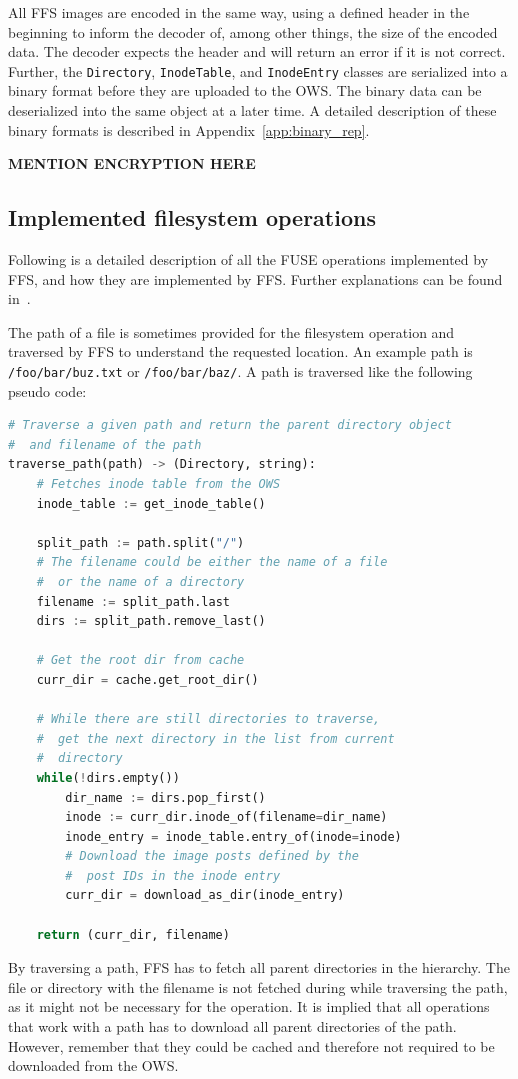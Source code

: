 All FFS images are encoded in the same way, using a defined header in the beginning to inform the decoder of, among other things, the size of the encoded data. The decoder expects the header and will return an error if it is not correct. Further, the \texttt{Directory}, \texttt{InodeTable}, and \texttt{InodeEntry} classes are serialized into a binary format before they are uploaded to the OWS. The binary data can be deserialized into the same object at a later time. A detailed description of these binary formats is described in Appendix~\ref{app:binary_rep}.

\textbf{MENTION ENCRYPTION HERE}

\subsection{Implemented filesystem operations}
\label{subsec:file_op}
Following is a detailed description of all the FUSE operations implemented by FFS, and how they are implemented by FFS. Further explanations can be found in \,\cite{kuenningCS135FUSEDocumentation2010}. 

The path of a file is sometimes provided for the filesystem operation and traversed by FFS to understand the requested location. An example path is \texttt{/foo/bar/buz.txt} or \texttt{/foo/bar/baz/}. A path is traversed like the following pseudo code:
\begin{lstlisting}[language=python, caption={Pseudocode of traversing a given path, returning the \texttt{Directory} and the filename}, label=lst:traverse_path,breaklines=true]
# Traverse a given path and return the parent directory object
#  and filename of the path
traverse_path(path) -> (Directory, string):
	# Fetches inode table from the OWS
	inode_table := get_inode_table()
	
	split_path := path.split("/")
	# The filename could be either the name of a file 
	#  or the name of a directory
	filename := split_path.last
	dirs := split_path.remove_last()

	# Get the root dir from cache
	curr_dir = cache.get_root_dir()

	# While there are still directories to traverse,
	#  get the next directory in the list from current
	#  directory
	while(!dirs.empty())
		dir_name := dirs.pop_first()
		inode := curr_dir.inode_of(filename=dir_name)
		inode_entry = inode_table.entry_of(inode=inode)
		# Download the image posts defined by the 
		#  post IDs in the inode entry
		curr_dir = download_as_dir(inode_entry)
	
	return (curr_dir, filename)

\end{lstlisting}
By traversing a path, FFS has to fetch all parent directories in the hierarchy. The file or directory with the filename is not fetched during while traversing the path, as it might not be necessary for the operation. It is implied that all operations that work with a path has to download all parent directories of the path. However, remember that they could be cached and therefore not required to be downloaded from the OWS. 

